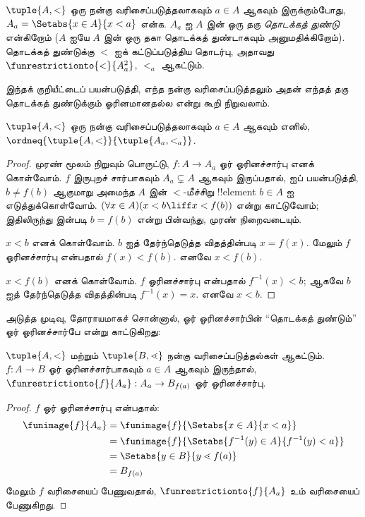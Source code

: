 \documentclass[../../../include/open-logic-section]{subfiles}
\begin{document}
\begin{defn}
$\tuple{A, <}$ ஒரு நன்கு வரிசைப்படுத்தலாகவும் $a \in A$ ஆகவும்
இருக்கும்போது, $A_a = \Setabs{x \in A}{x < a}$ என்க. $A_a$ ஐ $A$ இன்
ஒரு தகு \emph{தொடக்கத் துண்டு} என்கிறோம் ($A$ ஐயே $A$ இன் ஒரு தகா
தொடக்கத் துண்டாகவும் அனுமதிக்கிறோம்). தொடக்கத் துண்டுக்கு $<$ ஐக்
கட்டுப்படுத்திய தொடர்பு, அதாவது $\funrestrictionto{\mathord{<}}{A_a^2}$,
$<_a$ ஆகட்டும்.
\end{defn}
\noindent
இந்தக் குறியீட்டைப் பயன்படுத்தி, எந்த நன்கு வரிசைப்படுத்தலும் அதன் எந்தத்
தகு தொடக்கத் துண்டுக்கும் ஓரினமானதல்ல என்று கூறி நிறுவலாம்.

\begin{lem}
$\tuple{A, <}$ ஒரு நன்கு வரிசைப்படுத்தலாகவும் $a \in A$ ஆகவும் எனில்,
$\ordneq{\tuple{A, <}}{\tuple{A_a, <_a}}$.
\end{lem}

\begin{proof}
முரண் மூலம் நிறுவும் பொருட்டு, $f \colon A \to A_a$ ஓர்
ஓரினச்சார்பு எனக் கொள்வோம். $f$ இருபுறச் சார்பாகவும் $A_a \subsetneq A$
ஆகவும் இருப்பதால்,  ஐப் பயன்படுத்தி,
$b \neq f(b)$ ஆகுமாறு அமைந்த $A$ இன் $<$-மீச்சிறு !!{element}
$b \in A$ ஐ எடுத்துக்கொள்வோம். $(\forall x \in A)(x<b \liff x < f(b))$ என்று
காட்டுவோம்; இதிலிருந்து
 இன்படி
$b = f(b)$ என்று பின்வந்து, முரண் நிறைவடையும்.

$x < b$ எனக் கொள்வோம். $b$ ஐத் தேர்ந்தெடுத்த விதத்தின்படி $x = f(x)$.
மேலும் $f$ ஓரினச்சார்பு என்பதால் $f(x) < f(b)$. எனவே $x < f(b)$.

$x < f(b)$ எனக் கொள்வோம். $f$ ஓரினச்சார்பு என்பதால்
$f^{-1}(x) < b$; ஆகவே $b$ ஐத் தேர்ந்தெடுத்த விதத்தின்படி
$f^{-1}(x) = x$. எனவே $x < b$.
\end{proof}

அடுத்த முடிவு, தோராயமாகச் சொன்னால், ஓர் ஓரினச்சார்பின் ``தொடக்கத் துண்டும்''
ஓர் ஓரினச்சார்பே என்று காட்டுகிறது:

\begin{lem}
$\tuple{A, <}$ மற்றும் $\tuple{B, \lessdot}$ நன்கு வரிசைப்படுத்தல்கள்
ஆகட்டும். $f \colon A \to B$ ஓர் ஓரினச்சார்பாகவும் $a \in A$ ஆகவும்
இருந்தால், $\funrestrictionto{f}{A_{a}} : A_a \to B_{f(a)}$ ஓர்
ஓரினச்சார்பு.
\end{lem}

\begin{proof}
$f$ ஓர் ஓரினச்சார்பு என்பதால்:
\begin{align*}
	\funimage{f}{A_a} &= \funimage{f}{\Setabs{x \in A}{x < a}}\\
	&= \funimage{f}{\Setabs{f^{-1}(y) \in A}{f^{-1}(y) < a}} \\
	&= \Setabs{y \in B}{y \lessdot f(a)} \\
	&=B_{f(a)} 
\end{align*}
மேலும் $f$ வரிசையைப் பேணுவதால், $\funrestrictionto{f}{A_a}$ உம்
வரிசையைப் பேணுகிறது.
\end{proof}
\end{document}
